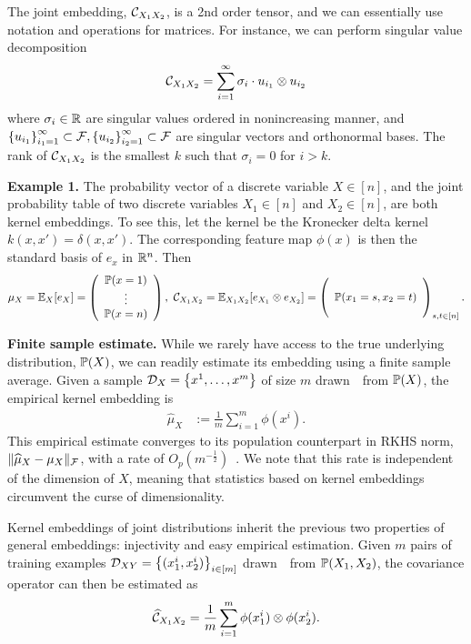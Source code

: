 \documentclass{article}
\newcommand{\hmu}{\widehat{\mu}}
\begin{document}
The joint embedding, $\mathcal{C}_{X_1 X_2}$, is a 2nd order tensor, and we can essentially use notation and operations for matrices. For instance, we can perform singular value decomposition
\[
    \mathcal{C}_{X_1X_2} = \sum_{i=1}^{\infty} \sigma_i \cdot u_{i_1} \otimes u_{i_2}
\]
where $\sigma_i \in \mathbb{R}$ are singular values ordered in nonincreasing manner, and $\left\{u_{i_1}\right\}_{i_1=1}^{\infty} \subset \mathcal{F}, \left\{u_{i_2}\right\}_{i_2=1}^{\infty} \subset \mathcal{F}$ are singular vectors and orthonormal bases. The rank of $\mathcal{C}_{X_1X_2}$ is the smallest $k$ such that $\sigma_i = 0$ for $i > k$.

{\bf Example 1.} The probability vector of a discrete variable $X \in [n]$, and the joint probability table of two discrete variables $X_1 \in [n]$ and $X_2 \in [n]$, are both kernel embeddings. To see this, let the kernel be the Kronecker delta kernel $k(x,x') = \delta(x,x')$. The corresponding feature map $\phi(x)$ is then the standard basis of $e_{x}$ in $\mathbb{R}^n$. Then
\begin{align}
    \mu_X
		= \mathbb{E}_X[e_X] = \left(
      \begin{array}{c}
         \mathbb{P}(x = 1) \cr
         \vdots \cr
         \mathbb{P}(x = n)
       \end{array}
    \right),~
		\mathcal{C}_{X_1X_2}
		= \mathbb{E}_{X_1X_2}[e_{X_1} \otimes e_{X_2}]=
		\left(
        \begin{array}{c}
            \cr
            \mathbb{P}(x_1=s,x_2=t) \cr
						\cr
        \end{array}
    \right)_{s,t \in [n]}. \label{eq:jointprobabilitytable}
\end{align}

{\bf Finite sample estimate.} While we rarely have access to the true underlying distribution, $\mathbb{P}(X)$,
we can readily estimate its embedding using a finite sample average. Given a sample $\mathcal{D}_{X} = \left\{x^1, \ldots, x^m\right\}$ of size $m$ drawn~\iid~from $\mathbb{P}(X)$, the empirical kernel embedding is
\begin{align}
    \hmu_{X} &:= \frac{1}{m} \sum\nolimits_{i=1}^m \phi(x^i). \label{eq:empirical_embedding}
\end{align}
This empirical estimate converges to its population counterpart in RKHS norm, $\|\hmu_X - \mu_X \|_{\Fcal}$, with a rate of $O_p(m^{-\frac{1}{2}})$~\cite{SmoGreSonSch07}. We note that this rate is independent of the dimension of $X$, meaning that statistics based on kernel embeddings circumvent the curse of dimensionality.

Kernel embeddings of joint distributions inherit the previous two properties of general embeddings: injectivity and easy empirical estimation. Given $m$ pairs of training examples $\mathcal{D}_{XY}=\left\{(x_1^i,x_2^i)\right\}_{i\in [m]}$ drawn~\iid~from $\mathbb{P}(X_1,X_2)$,
the covariance operator can then be estimated as
\begin{align}
 \widehat {\mathcal{C}}_{X_1X_2} =\frac{1}{m}\sum_{i=1}^m \phi(x_1^i) \otimes \phi(x_2^i). \label{eq:empirical_covariance}
\end{align}
\end{document}
